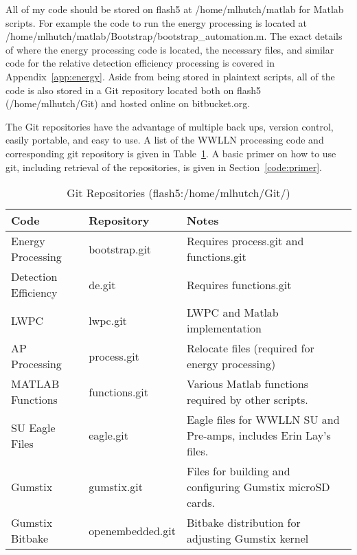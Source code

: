 All of my code should be stored on flash5 at /home/mlhutch/matlab for Matlab scripts.
For example the code to run the energy processing is located at /home/mlhutch/matlab/Bootstrap/bootstrap\_automation.m.
The exact details of where the energy processing code is located, the necessary files, and similar code for the relative detection efficiency processing is covered in Appendix~\ref{app:energy}.
Aside from being stored in plaintext scripts, all of the code is also stored in a Git repository located both on flash5 (/home/mlhutch/Git) and hosted online on bitbucket.org.

The Git repositories have the advantage of multiple back ups, version control, easily portable, and easy to use.
A list of the WWLLN processing code and corresponding git repository is given in Table~\ref{code:repo}.
A basic primer on how to use git, including retrieval of the repositories, is given in Section~\ref{code:primer}.

\begin{table}[h!]
\caption{Git Repositories (flash5:/home/mlhutch/Git/)}
\begin{center}
\begin{tabular}{|p{1.5in}|p{1.25in}|p{3in}|}

\hline
{\bf Code} &	{\bf Repository} &	{\bf Notes}\\

\hline
\rule{0pt}{3ex}
Energy Processing	&bootstrap.git	&	Requires process.git and functions.git \\ 

\hline
\rule{0pt}{3ex}
Detection Efficiency	&de.git	&	Requires functions.git\\ 

\hline
\rule{0pt}{3ex}
LWPC	&lwpc.git	&	LWPC and Matlab implementation\\ 

\hline
\rule{0pt}{3ex}
AP Processing	&process.git	&	Relocate files (required for energy processing)\\ 

\hline
\rule{0pt}{3ex}
MATLAB Functions	&functions.git	&	Various Matlab functions required by other scripts.\\ 

\hline
\rule{0pt}{3ex}
SU Eagle Files	&eagle.git	&	Eagle files for WWLLN SU and Pre-amps, includes Erin Lay's files.\\ 

\hline
\rule{0pt}{3ex}
Gumstix	&gumstix.git	&	Files for building and configuring Gumstix microSD cards.\\ 

\hline
\rule{0pt}{3ex}
Gumstix Bitbake	&openembedded.git	&	Bitbake distribution for adjusting Gumstix kernel\\ 

\hline
\end{tabular}
\end{center}
\label{code:repo}
\end{table}

